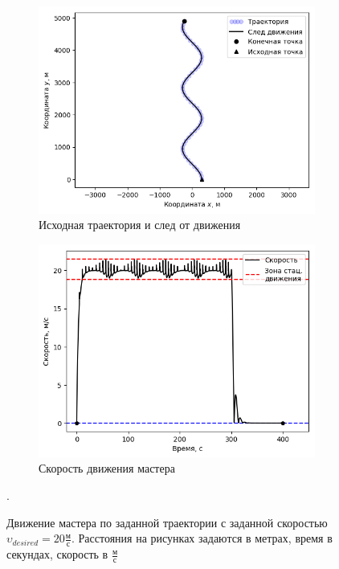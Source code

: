 \documentclass[12pt,a4paper]{article}
\begin{document}
\begin{figure}[!htbp]
	\centering
	\begin{subfigure}{.5\textwidth}
		\centering
		\includegraphics[width=1\linewidth]{master-trajectory-0}
		\caption{Исходная траектория и след от движения}
		\label{fig:sub1}
	\end{subfigure}%
	\begin{subfigure}{.5\textwidth}
		\centering
		\includegraphics[width=1\linewidth]{master-trajectory-0-velocity}
		\caption{Скорость движения мастера}
		\label{fig:sub2}
	\end{subfigure}
	\caption{Движение мастера по заданной траектории с заданной скоростью $\upsilon_{desired} = 20 \frac{\text{м}}{\text{с}}$. Расстояния на рисунках задаются в метрах, время в секундах, скорость в $\frac{\text{м}}{\text{с}}$}.
	\label{fig:test}
\end{figure}
\end{document}
